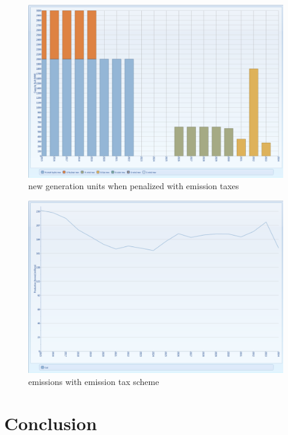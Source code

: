 \documentclass{article}
\begin{document}
\begin{figure}[htbp]
\begin{center}
\includegraphics[width=13cm,keepaspectratio=true]{figures/Expansion/EmissionTax/CapacityBuiltNewGenET}
\caption{new generation units when penalized with emission taxes}
\label{fig:CapacityBuiltNewGenET}
\end{center}
\end{figure}
\begin{figure}[htbp]
\begin{center}
\includegraphics[width=13cm,keepaspectratio=true]{figures/Expansion/EmissionTax/Co2ProductionET}
\caption{emissions with emission tax scheme}
\label{fig:Co2ProductionET}
\end{center}
\end{figure}


\newpage
\section{Conclusion}
\end{document}
